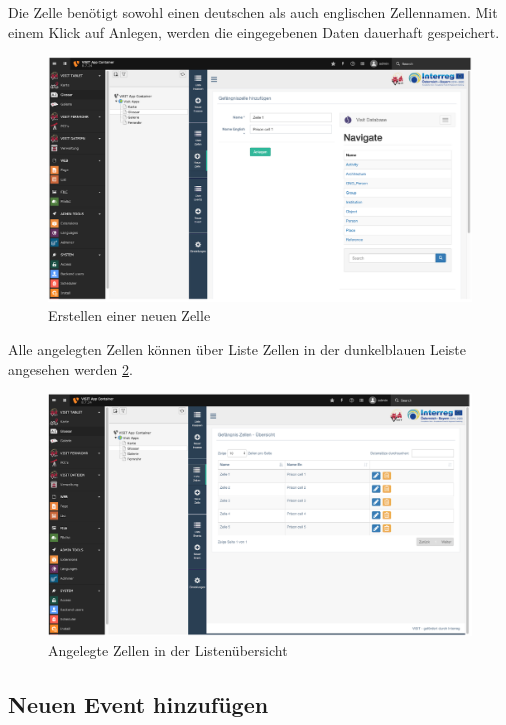 Die Zelle benötigt sowohl einen deutschen als auch englischen Zellennamen. Mit einem Klick auf \glqq Anlegen\grqq{}, werden die eingegebenen Daten dauerhaft gespeichert. 
\begin{figure}[ht!]
\centering
\includegraphics[width=12cm]{Figures/paula/glossar/neue_zelle_erstellen.png}
\caption{Erstellen einer neuen Zelle}
\label{img:neue_zelle}
\end{figure}

Alle angelegten Zellen können über \glqq Liste Zellen\grqq{} in der dunkelblauen Leiste angesehen werden \ref{img:angelegte_zellen}.

\begin{figure}[ht!]
\centering
\includegraphics[width=12cm]{Figures/paula/glossar/angelegte_zellen.png}
\caption{Angelegte Zellen in der Listenübersicht}
\label{img:angelegte_zellen}
\end{figure}

\subsection{Neuen Event hinzufügen}

